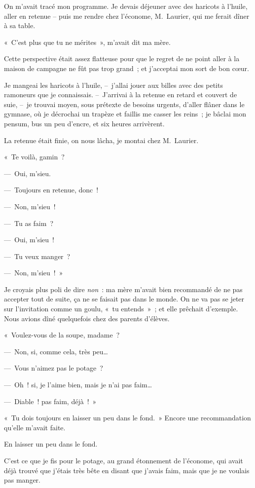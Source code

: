 \documentclass[french,twoside]{book} %
\begin{document}
\bigbreak
\noindent On m’avait tracé mon programme. Je devais déjeuner avec des haricots à l’huile, aller en retenue – puis me rendre chez l’économe, M. Laurier, qui me ferait dîner à sa table.\par
« C’est plus que tu ne mérites », m’avait dit ma mère.\par
Cette perspective était assez flatteuse pour que le regret de ne point aller à la maison de campagne ne fût pas trop grand ; et j’acceptai mon sort de bon cœur.\par
Je mangeai les haricots à l’huile, – j’allai jouer aux billes avec des petits ramoneurs que je connaissais. – J’arrivai à la retenue en retard et couvert de suie, – je trouvai moyen, sous prétexte de besoins urgents, d’aller flâner dans le gymnase, où je décrochai un trapèze et faillis me casser les reins ; je bâclai mon pensum, bus un peu d’encre, et six heures arrivèrent.\par
La retenue était finie, on nous lâcha, je montai chez M. Laurier.\par
« Te voilà, gamin ?\par
— Oui, m’sieu.\par
— Toujours en retenue, donc !\par
— Non, m’sieu !\par
— Tu as faim ?\par
— Oui, m’sieu !\par
— Tu veux manger ?\par
— Non, m’sieu ! »\par
Je croyais plus poli de dire \emph{non} : ma mère m’avait bien recommandé de ne pas accepter tout de suite, ça ne se faisait pas dans le monde. On ne va pas se jeter sur l’invitation comme un goulu, « tu entends » ; et elle prêchait d’exemple. Nous avions dîné quelquefois chez des parents d’élèves.\par
« Voulez-vous de la soupe, madame ?\par
— Non, si, comme cela, très peu…\par
— Vous n’aimez pas le potage ?\par
— Oh ! si, je l’aime bien, mais je n’ai pas faim…\par
— Diable ! pas faim, déjà ! »\par
\bigbreak
\noindent « Tu dois toujours en laisser un peu dans le fond. » Encore une recommandation qu’elle m’avait faite.\par
En laisser un peu dans le fond.\par
C’est ce que je fis pour le potage, au grand étonnement de l’économe, qui avait déjà trouvé que j’étais très bête en disant que j’avais faim, mais que je ne voulais pas manger.\par
\end{document}
